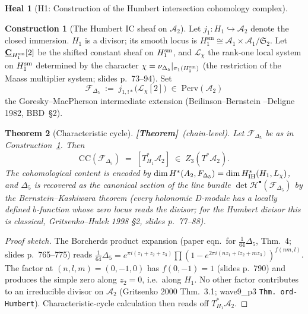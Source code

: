 \documentclass[11pt]{amsart}
\newtheorem{theorem}{Theorem}
\theoremstyle{definition}
\newtheorem{heal}[attack]{Heal}
\newtheorem{construction}[theorem]{Construction}
\providecommand{\Perv}{\mathrm{Perv}}
\providecommand{\cH}{\mathcal{H}}
\providecommand{\cL}{\mathcal{L}}
\providecommand{\cF}{\mathcal{F}}
\providecommand{\bC}{\mathbf{C}}
\providecommand{\Dfive}{\Delta_5}
\providecommand{\CharCyc}{\mathrm{CC}}
\providecommand{\ClaimStatusTheorem}{\textbf{[Theorem]}}
\begin{document}
\begin{heal}[H1: Construction of the Humbert intersection
cohomology complex]\leavevmode

\begin{construction}[The Humbert IC sheaf on $\mathcal{A}_2$]
\label{constr:IC-humbert}
Let $j_1 \colon H_1 \hookrightarrow \mathcal{A}_2$ denote the closed
immersion. $H_1$ is a divisor; its smooth locus is
$H_1^{\mathrm{sm}} \cong \mathcal{A}_1 \times \mathcal{A}_1 /
\mathfrak{S}_2$. Let $\underline{\bC}_{H_1^{\rm sm}}[2]$ be the shifted
constant sheaf on $H_1^{\rm sm}$, and $\cL_\chi$ the rank-one local
system on $H_1^{\rm sm}$ determined by the character
$\chi = \nu_{\Dfive} |_{\pi_1(H_1^{\rm sm})}$ (the restriction of the
Maass multiplier system; slides p.~73--94). Set
\[
 \cF_{\Dfive} \;:=\; j_{1,!*}\bigl(\cL_\chi[2]\bigr)
 \;\in\; \Perv(\mathcal{A}_2)
\]
the Goresky--MacPherson intermediate extension (Beilinson--Bernstein
--Deligne 1982, BBD~\S2).
\end{construction}

\begin{theorem}[Characteristic cycle]\label{thm:CC-humbert}
\ClaimStatusTheorem\ (chain-level). Let $\cF_{\Dfive}$ be as in
Construction~\ref{constr:IC-humbert}. Then
\[
 \CharCyc(\cF_{\Dfive})
 \;=\; [T^*_{H_1}\mathcal{A}_2]
 \;\in\; Z_3(T^*\mathcal{A}_2).
\]
The cohomological content is encoded by
$\dim \cH^*(\mathcal{A}_2, \cF_{\Dfive}) = \dim H^*_{\rm IH}(H_1, \cL_\chi)$,
and $\Dfive$ is recovered as the canonical section of the line bundle
$\det \cH^\bullet(\cF_{\Dfive})$ by the Bernstein--Kashiwara theorem
(every holonomic D-module has a locally defined $b$-function whose
zero locus reads the divisor; for the Humbert divisor this is
classical, Gritsenko--Hulek 1998 \S 2, slides p.~77--88).
\end{theorem}

\begin{proof}[Proof sketch]
The Borcherds product expansion (paper eqn.\ for $\tfrac{1}{64}\Dfive$,
Thm.~4; slides p.~765--775) reads
$\tfrac{1}{64}\Dfive = e^{\pi i(z_1+z_2+z_3)} \prod (1 - e^{2\pi i(n
z_1 + l z_2 + m z_3)})^{f(nm, l)}$. The factor at $(n, l, m) = (0,
-1, 0)$ has $f(0, -1) = 1$ (slides p.~790) and produces the simple
zero along $z_2 = 0$, i.e.\ along $H_1$. No other factor contributes
to an irreducible divisor on $\mathcal{A}_2$ (Gritsenko 2000 Thm.~3.1;
wave9\_p3 \texttt{Thm.\ ord-Humbert}). Characteristic-cycle
calculation then reads off $T^*_{H_1}\mathcal{A}_2$.
\end{proof}


\end{heal}
\end{document}
